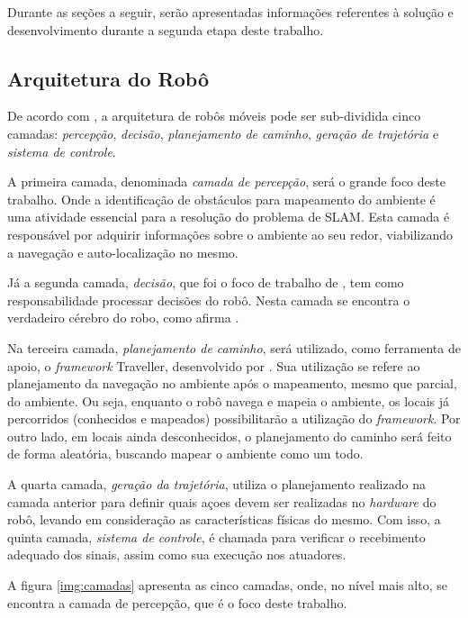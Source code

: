 	Durante as seções a seguir, serão apresentadas informações referentes à solução e desenvolvimento durante a segunda etapa deste trabalho.

	\subsection{Arquitetura do Robô} %
	\label{sub:arquitetura_do_robô}
		
		De acordo com \cite{vieira}, a arquitetura de robôs móveis pode ser sub-dividida cinco camadas: \textit{percepção}, \textit{decisão}, \textit{planejamento de caminho}, \textit{geração de trajetória} e \textit{sistema de controle}.

		A primeira camada, denominada \textit{camada de percepção}, será o grande foco deste trabalho. Onde a identificação de obstáculos para mapeamento do ambiente é uma atividade essencial para a resolução do problema de SLAM. Esta camada é responsável por adquirir informações sobre o ambiente ao seu redor, viabilizando a navegação e auto-localização no mesmo.

		Já a segunda camada, \textit{decisão}, que foi o foco de trabalho de \cite{tccCarol}, tem como responsabilidade processar decisões do robô. Nesta camada se encontra o verdadeiro cérebro do robo, como afirma \cite{vieira}.

		Na terceira camada, \textit{planejamento de caminho}, será utilizado, como ferramenta de apoio, o \textit{framework} Traveller, desenvolvido por \cite{tccRodrigo}. Sua utilização se refere ao planejamento da navegação no ambiente após o mapeamento, mesmo que parcial, do ambiente. Ou seja, enquanto o robô navega e mapeia o ambiente, os locais já percorridos (conhecidos e mapeados) possibilitarão a utilização do \textit{framework}. Por outro lado, em locais ainda desconhecidos, o planejamento do caminho será feito de forma aleatória, buscando mapear o ambiente como um todo.

		A quarta camada, \textit{geração da trajetória}, utiliza o planejamento realizado na camada anterior para definir quais açoes devem ser realizadas no \textit{hardware} do robô, levando em consideração as características físicas do mesmo. Com isso, a quinta camada, \textit{sistema de controle}, é chamada para verificar o recebimento adequado dos sinais, assim como sua execução nos atuadores. 

		A figura \ref{img:camadas} apresenta as cinco camadas, onde, no nível mais alto, se encontra a camada de percepção, que é o foco deste trabalho. 

